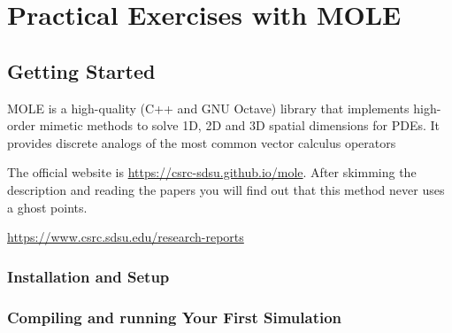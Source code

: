 \part{Practical Exercises with MOLE}

\chapter{Getting Started}

MOLE is a high-quality (C++ and GNU Octave) library that
implements high-order mimetic methods to solve 1D, 2D and 3D
spatial dimensions for PDEs.
It provides discrete analogs of the most common vector calculus
operators

The official website is \url{https://csrc-sdsu.github.io/mole}.
After skimming the description and reading the papers you will find
out that this method never uses a ghost points.

\url{https://www.csrc.sdsu.edu/research-reports}

\section{Installation and Setup}

\section{Compiling and running Your First Simulation}


